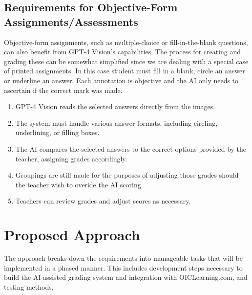 \documentclass[ms,twoside,print]{nuthesis}
\begin{document}
\subsection{Requirements for Objective-Form Assignments/Assessments}

Objective-form assignments, such as multiple-choice or fill-in-the-blank questions, can also benefit from GPT-4 Vision's capabilities. The process for creating and grading these can be somewhat simplified since we are dealing with a special case of printed assignments. In this case student must fill in a blank, circle an answer or underline an answer. Each annotation is objective and the AI only needs to ascertain if the correct mark was made. 


\begin{enumerate}
    \item GPT-4 Vision reads the selected answers directly from the images.
    \item The system must handle various answer formats, including circling, underlining, or filling boxes.
    \item The AI compares the selected answers to the correct options provided by the teacher, assigning grades accordingly.
    \item Groupings are still made for the purposes of adjusting those grades should the teacher wish to overide the AI scoring.
    \item Teachers can review grades and adjust scores as necessary.
\end{enumerate}

\section{Proposed Approach}

The approach breaks down the requirements into manageable tasks that will be implemented in a phased manner. This includes development steps necessary to build the AI-assisted grading system and integration with OICLearning.com, and testing methods, 

\end{document}
